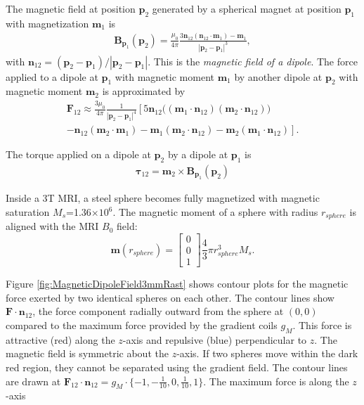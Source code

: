 \documentclass[graybox,usenames]{svmult}
\begin{document}
The magnetic field at position $\mathbf{p}_2$ generated by a spherical magnet at position $\mathbf{p}_1$ with magnetization  $\mathbf{m}_1$ is  \cite{Schill2003} %
\begin{align}
\label{eq:dipoleMagField}
 \mathbf{B}_{\mathbf{p}_1}(\mathbf{p}_2) = \frac{\mu_0}{4 \pi}\frac{3 \mathbf{n}_{12}(\mathbf{n}_{12} \cdot \mathbf{m}_1) - \mathbf{m}_1}
 {|\mathbf{p}_2-\mathbf{p}_1|^3},
\end{align}
with  $\mathbf{n}_{12} = (\mathbf{p}_2-\mathbf{p}_1)/|\mathbf{p}_2-\mathbf{p}_1|$. This is the \emph{magnetic field of a dipole}.
 The force applied to a dipole at $\mathbf{p}_1$ with magnetic moment $\mathbf{m}_1$ by another dipole at $\mathbf{p}_2$ with magnetic moment $\mathbf{m}_2$ is approximated by
\begin{align}
\mathbf{F}_{12} \approx \frac{3\mu_0}{4 \pi} \frac{1}{|\mathbf{p}_2 - \mathbf{p}_1 |^4}
\left[5 \mathbf{n}_{12}\Big(\left(\mathbf{m}_1 \cdot \mathbf{n}_{12} \right)   \left(\mathbf{m}_2 \cdot \mathbf{n}_{12} \right) \Big) \right. \nonumber \\
\left.
-  \mathbf{n}_{12} \left(\mathbf{m}_2 \cdot \mathbf{m}_1 \right)
-  \mathbf{m}_{1} \left(\mathbf{m}_2 \cdot \mathbf{n}_{12} \right)  -  \mathbf{m}_{2} \left(\mathbf{m}_1 \cdot \mathbf{n}_{12}\right)   \right].
\label{eq:dipoleForce}
\end{align}

The torque applied on a dipole at $\mathbf{p}_2$ by a dipole at $\mathbf{p}_1$ is 
\begin{align}
\mathbf{\tau}_{12} = \mathbf{m}_2 \times  \mathbf{B}_{\mathbf{p}_1}(\mathbf{p}_2) 
\label{eq:dipoleTorque}
\end{align}

Inside a 3T MRI, a steel sphere becomes fully magnetized with magnetic saturation $M_s$=1.36$\times10^6$.  The magnetic moment of a sphere with radius $r_{sphere}$ is aligned with the MRI $B_0$ field:
\begin{equation}
\mathbf{m}(r_{sphere})=\left[ \begin{array}{ccc}
0 \\
0\\
1 \end{array} \right]
 \frac{4}{3} \pi r_{sphere}^3 M_s.\label{eq:magnetMoment}
\end{equation} 

Figure \ref{fig:MagneticDipoleField3mmRast} shows contour plots for the magnetic force exerted by two identical spheres on each other.  
   The contour lines show $\mathbf{F}\cdot \mathbf{n}_{12}$, the force component radially outward from the sphere at $(0,0)$ compared to the maximum force provided by the gradient coils $g_{M}$.  This force is attractive (red) along the $z$-axis and repulsive (blue) perpendicular to $z$. The magnetic field is symmetric about the $z$-axis.  If two spheres move within the dark red region, they cannot be separated using the gradient field. The contour lines are drawn at $\mathbf{F}_{12}\cdot \mathbf{n}_{12} = g_{M}\cdot \{-1,-\frac{1}{10},0,\frac{1}{10},1\}$.  The maximum force is along the $z$-axis
\end{document}
